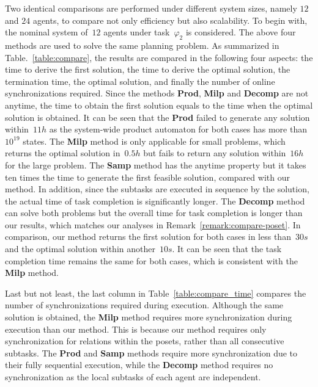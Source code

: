 Two identical comparisons are performed under different system sizes,
namely $12$ and $24$ agents, to compare not only efficiency but also scalability.
To begin with, the nominal system of~$12$ agents under task~$\varphi_2$ is considered.
The above four methods are used to solve the same planning problem.
As summarized in Table.~\ref{table:compare},
the results are compared in the following four aspects:
the time to derive the first solution,
the time to derive the optimal solution,
the termination time, the optimal solution,
and finally the number of online synchronizations required.
Since the methods \textbf{Prod}, \textbf{Milp} and \textbf{Decomp} are not
anytime, the time to obtain  the first solution equals to the time
when the optimal solution is obtained.
It can be seen that the \textbf{Prod} failed to generate any solution
within~$11h$ as the system-wide product automaton for both cases
has more than $10^{19}$ states.
The \textbf{Milp} method is only applicable for small problems,
which returns the optimal solution in~$0.5h$ but fails to
return any solution within~$16h$ for the large problem.
The \textbf{Samp} method has the anytime property but it takes ten times
the time to generate
the first feasible solution, compared with our method.
In addition, since the subtasks are executed in sequence by the solution,
the actual time of task completion is significantly longer.
The \textbf{Decomp} method can solve both problems but the overall time
for task completion is longer than our results,
which matches our analyses in Remark~\ref{remark:compare-poset}.
In comparison, our method returns the first solution for both cases in less
than~$30s$ and the optimal solution within another~$10s$.
It can be seen that the task completion time remains the same for both cases,
which is consistent with the \textbf{Milp} method.

Last but not least, the last column in Table~\ref{table:compare_time} compares the number
of synchronizations required during execution.
Although the same solution is obtained, the \textbf{Milp} method requires more
synchronization during execution than our method.
This is because our method requires only synchronization for relations within the
posets, rather than all consecutive subtasks.
The \textbf{Prod} and \textbf{Samp} methods require more synchronization due to
their fully sequential execution,
while the \textbf{Decomp} method requires no synchronization as
the local subtasks of each agent are independent.

